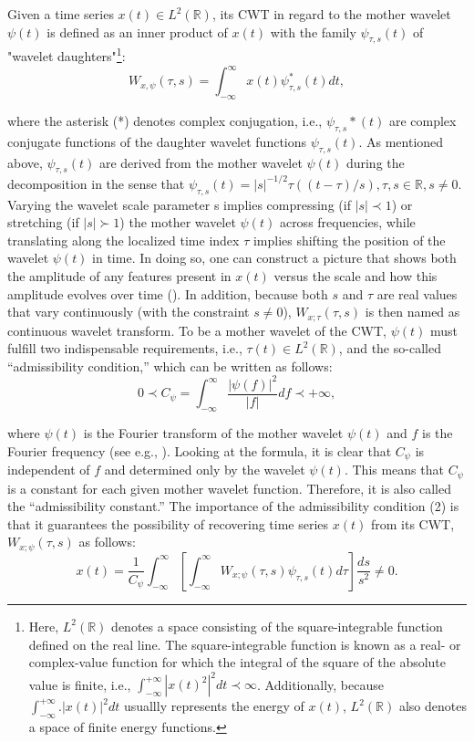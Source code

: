 \documentclass[a4paper,fleqn]{cas-sc}
\begin{document}
Given a time series $x(t)\in L^2(\mathbb{R})$, its CWT in regard to the mother wavelet $\psi(t)$ is defined as an inner product of $x(t)$ with the family $\psi_{\tau,s}(t)$ of "wavelet daughters"\footnote{Here, $L^2(\mathbb{R})$ denotes a space consisting of the square-integrable function defined on the real line. The square-integrable function is known as a real- or complex-value function for which the integral of the square of the absolute value is finite, i.e., $\int_{-\infty}^{+\infty} |x(t)^2|^2 dt \prec \infty$. Additionally, because $\int_{-\infty}^{+\infty}.|x(t)|^2 dt$ usuallly represents the energy of $x(t)$, $L^2(\mathbb{R})$ also denotes a space of finite energy functions.}:
\begin{equation}
    W_{x,\psi}(\tau,s)=\int_{-\infty}^{\infty}x(t)\psi_{\tau,s}^*(t)dt,
\end{equation}

where the asterisk (*) denotes complex conjugation, i.e., $\psi_{\tau,s}*(t)$ are complex conjugate functions of the daughter wavelet functions $\psi_{\tau,s}(t)$. As mentioned above, $\psi_{\tau,s}(t)$ are derived from the mother wavelet $\psi(t)$ during the decomposition in the sense that $\psi_{\tau,s}(t)=|s|^{-1/2}\tau((t - \tau)/s), \tau, s \in \mathbb{R}, s \neq 0$. Varying the wavelet scale parameter s implies compressing (if $|s| \prec 1$) or stretching (if $|s| \succ 1$) the mother wavelet $\psi(t)$ across frequencies, while translating along the localized time index $\tau$ implies shifting the position of the wavelet $\psi(t)$ in time. In doing so, one can construct a picture that shows both the amplitude of any features present in $x(t)$ versus the scale and how this amplitude evolves over time (\citealp{torrence1998}). In addition, because both $s$ and $\tau$ are real values that vary continuously (with the constraint $s \neq 0$), $W_{x;\tau}(\tau, s)$ is then named as continuous wavelet transform.
To be a mother wavelet of the CWT, $\psi(t)$ must fulfill two indispensable requirements, i.e., $\tau(t)\in L^2 (\mathbb{R})$, and the so-called “admissibility condition,” which can be written as follows:
\begin{equation}
    0 \prec C_\psi = \int_{-\infty}^\infty\frac{|\psi(f)|^2}{|f|}d f \prec + \infty,
\end{equation}

where $\psi(t)$ is the Fourier transform of the mother wavelet $\psi(t)$ and $f$ is the Fourier frequency (see e.g., \citealp{daubechies1992ten}). Looking at the formula, it is clear that $C_\psi$ is independent of $f$ and determined only by the wavelet $\psi(t)$. This means that $C_\psi$ is a constant for each given mother wavelet function. Therefore, it is also called the “admissibility constant.” The importance of the admissibility condition (2) is that it guarantees the possibility of recovering time series $x(t)$ from its CWT, $W_{x;\psi}(\tau, s)$ as follows:
\begin{equation}
    x(t)=\dfrac{1}{C_\psi}\int_{-\infty}^\infty\left[\int_{-\infty}^\infty W_{x;\psi}(\tau, s)\psi_{\tau,s}(t)d \tau \right] \dfrac{ds}{s^2}\neq 0.
\end{equation}
\end{document}
